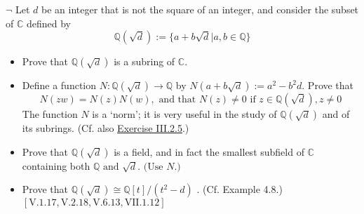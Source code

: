 \documentclass[12pt,letterpaper,boxed]{hmcpset}
\begin{document}
\hypertarget{Exercise III.4.10}{}
\begin{problem}[4.10]
	$\neg$ Let $d$ be an integer that is not the square of an integer, and consider the subset of $\mathbb{C}$ defined by 
	\[
	\mathbb{Q}(\sqrt{d}):=\{a+b \sqrt{d} | a, b \in \mathbb{Q}\}
	\]
	\begin{itemize}
		\item Prove that $\mathbb{Q}(\sqrt{d})$ is a subring of $\mathbb{C}$.
		\item Define a function $N: \mathbb{Q}(\sqrt{d}) \rightarrow \mathbb{Q}$ by $N(a+b \sqrt{d}):=a^{2}-b^{2} d .$ Prove that
		\[
		N(z w)=N(z) N(w), \text { and that } N(z) \neq 0 \text { if } z \in \mathbb{Q}(\sqrt{d}), z \neq 0
		\]
		The function $N$ is a `norm'; it is very useful in the study of $\mathbb{Q}(\sqrt{d})$ and of its subrings. (Cf. also \hyperlink{Exercise III.2.5}{Exercise III.2.5}.)
		\item Prove that $\mathbb{Q}(\sqrt{d})$ is a field, and in fact the smallest subfield of $\mathbb{C}$ containing both $\mathbb{Q} \text { and } \sqrt{d} . \text { (Use } N .)$
		\item Prove that $\mathbb{Q}(\sqrt{d})\cong \mathbb{Q}[t] /\left(t^{2}-d\right)$ . (Cf. Example 4.8.)\\
		$[\mathrm{V} .1 .17, \mathrm{V} .2 .18, \mathrm{V} .6 .13, \mathrm{VII} .1 .12]$
	\end{itemize}	
\end{problem}
\end{document}
